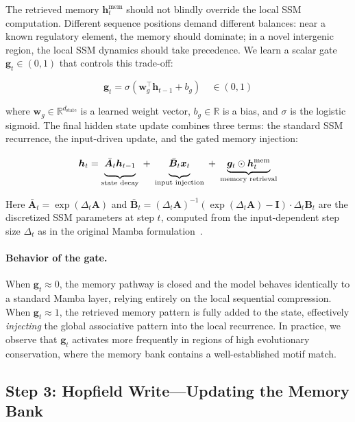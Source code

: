 \documentclass[journal,10pt]{IEEEtran}
\newcommand{\R}{\mathbb{R}}
\begin{document}
The retrieved memory $\bm{h}_t^{\text{mem}}$ should not blindly override the local SSM computation. Different sequence positions demand different balances: near a known regulatory element, the memory should dominate; in a novel intergenic region, the local SSM dynamics should take precedence. We learn a scalar gate $\bm{g}_t \in (0, 1)$ that controls this trade-off:

\begin{equation}
    \bm{g}_t = \sigma\left( \bm{w}_g^\top \bm{h}_{t-1} + b_g \right) \quad \in (0, 1)
    \label{eq:gate}
\end{equation}

where $\bm{w}_g \in \R^{d_{\text{state}}}$ is a learned weight vector, $b_g \in \R$ is a bias, and $\sigma$ is the logistic sigmoid. The final hidden state update combines three terms: the standard SSM recurrence, the input-driven update, and the gated memory injection:

\begin{equation}
    \bm{h}_t = \underbrace{\vphantom{\Big(}\bar{\bm{A}}_t \bm{h}_{t-1}}_{\text{state decay}} \;+\; \underbrace{\vphantom{\Big(}\bar{\bm{B}}_t \bm{x}_t}_{\text{input injection}} \;+\; \underbrace{\bm{g}_t \odot \bm{h}_t^{\text{mem}}}_{\text{memory retrieval}}
    \label{eq:ssm_with_memory}
\end{equation}

Here $\bar{\bm{A}}_t = \exp(\Delta_t \bm{A})$ and $\bar{\bm{B}}_t = (\Delta_t \bm{A})^{-1}(\exp(\Delta_t \bm{A}) - \bm{I}) \cdot \Delta_t \bm{B}_t$ are the discretized SSM parameters at step $t$, computed from the input-dependent step size $\Delta_t$ as in the original Mamba formulation~\cite{gu2023mamba}.

\paragraph{Behavior of the gate.}
When $\bm{g}_t \approx 0$, the memory pathway is closed and the model behaves identically to a standard Mamba layer, relying entirely on the local sequential compression. When $\bm{g}_t \approx 1$, the retrieved memory pattern is fully added to the state, effectively \textit{injecting} the global associative pattern into the local recurrence. In practice, we observe that $\bm{g}_t$ activates more frequently in regions of high evolutionary conservation, where the memory bank contains a well-established motif match.

\subsection{Step 3: Hopfield Write---Updating the Memory Bank}
\label{sec:hopfield_write}
\end{document}
